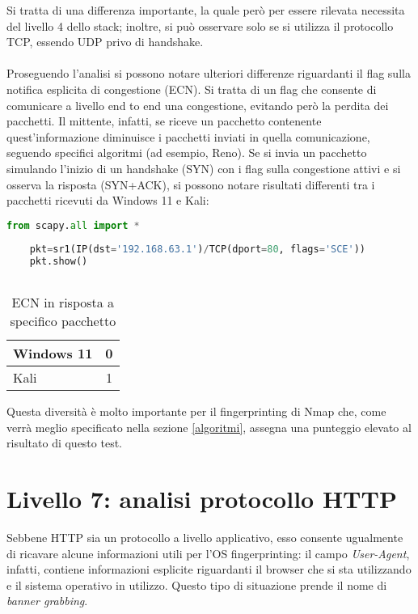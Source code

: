 Si tratta di una differenza importante, la quale però per essere rilevata necessita del livello 4 dello stack; inoltre, si può osservare solo se si utilizza il protocollo TCP, essendo UDP privo di handshake.
\\
\\
Proseguendo l'analisi si possono notare ulteriori differenze riguardanti il flag sulla notifica esplicita di congestione (ECN). Si tratta di un flag che consente di comunicare a livello end to end una congestione, evitando però la perdita dei pacchetti. Il mittente, infatti, se riceve un pacchetto contenente quest'informazione diminuisce i pacchetti inviati in quella comunicazione, seguendo specifici algoritmi (ad esempio, Reno). 
Se si invia un pacchetto simulando l'inizio di un handshake (SYN) con i flag sulla congestione attivi e si osserva la risposta (SYN+ACK), si possono notare risultati differenti tra i pacchetti ricevuti da Windows 11 e Kali:
\\
\begin{lstlisting}[language=Python, caption={Comando Python per l'invio del pacchetto}]
	from scapy.all import *
	
	pkt=sr1(IP(dst='192.168.63.1')/TCP(dport=80, flags='SCE'))
	pkt.show()
	
\end{lstlisting}

\begin{table}[h]
	\centering
	\begin{tabular}{| l | c |}
		\hline
		\rowcolor{blue!10} Windows 11 & 0
		\\
		\hline
		\rowcolor{red!10} Kali & 1
		\\
		\hline
		
	\end{tabular}
	\caption{ECN in risposta a specifico pacchetto}
	\label{tab:ECN}
\end{table}

Questa diversità è molto importante per il fingerprinting di Nmap che, come verrà meglio specificato nella sezione \ref{algoritmi}, assegna una punteggio elevato al risultato di questo test. 

\section{Livello 7: analisi protocollo HTTP}
Sebbene HTTP sia un protocollo a livello applicativo, esso consente ugualmente di ricavare alcune informazioni utili per l'OS fingerprinting: il campo \textit{User-Agent}, infatti, contiene informazioni esplicite riguardanti il browser che si sta utilizzando e il sistema operativo in utilizzo. Questo tipo di situazione prende il nome di \textit{banner grabbing}.

